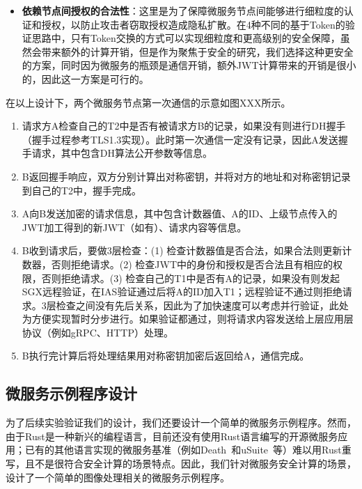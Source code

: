 \begin{itemize}
    \item \textbf{依赖节点间授权的合法性}：这里是为了保障微服务节点间能够进行细粒度的认证和授权，以防止攻击者窃取授权造成隐私扩散。在4种不同的基于Token的验证思路中，只有Token交换的方式可以实现细粒度和更高级别的安全保障，虽然会带来额外的计算开销，但是作为聚焦于安全的研究，我们选择这种更安全的方案，同时因为微服务的瓶颈是通信开销，额外JWT计算带来的开销是很小的，因此这一方案是可行的。
\end{itemize}

在以上设计下，两个微服务节点第一次通信的示意如图XXX所示。

\begin{enumerate}
    \item 请求方A检查自己的T2中是否有被请求方B的记录，如果没有则进行DH握手（握手过程参考TLS1.3实现）。此时第一次通信一定没有记录，因此A发送握手请求，其中包含DH算法公开参数等信息。
    \item B返回握手响应，双方分别计算出对称密钥，并将对方的地址和对称密钥记录到自己的T2中，握手完成。
    \item A向B发送加密的请求信息，其中包含计数器值、A的ID、上级节点传入的JWT加工得到的新JWT（如有）、请求内容等信息。
    \item B收到请求后，要做3层检查：(1) 检查计数器值是否合法，如果合法则更新计数器，否则拒绝请求。(2) 检查JWT中的身份和授权是否合法且有相应的权限，否则拒绝请求。(3) 检查自己的T1中是否有A的记录，如果没有则发起SGX远程验证，在IAS验证通过后将A的ID加入T1；远程验证不通过则拒绝请求。3层检查之间没有先后关系，因此为了加快速度可以考虑并行验证，此处为方便实现暂时分步进行。如果验证都通过，则将请求内容发送给上层应用层协议（例如gRPC、HTTP）处理。
    \item B执行完计算后将处理结果用对称密钥加密后返回给A，通信完成。
\end{enumerate}

\subsection{微服务示例程序设计}

为了后续实验验证我们的设计，我们还要设计一个简单的微服务示例程序。然而，由于Rust是一种新兴的编程语言，目前还没有使用Rust语言编写的开源微服务应用；已有的其他语言实现的微服务基准（例如Death~\cite{}和uSuite~\cite{}等）难以用Rust重写，且不是很符合安全计算的场景特点。因此，我们针对微服务安全计算的场景，设计了一个简单的图像处理相关的微服务示例程序。
